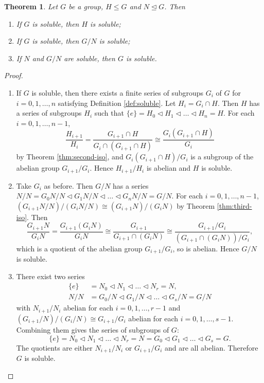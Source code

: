 \documentclass[12pt]{article}
\newtheorem{theorem}{Theorem}
\theoremstyle{definition}
\begin{document}
\begin{theorem} \label{thm:soluble-main}
    Let $G$ be a group, $H \le G$ and $N \trianglelefteq G$. Then 
    \begin{enumerate}
        \item If $G$ is soluble, then $H$ is soluble;
        \item If $G$ is soluble, then $G / N$ is soluble; 
        \item If $N$ and $G / N$ are soluble, then $G$ is soluble. 
    \end{enumerate}
\end{theorem}
\begin{proof}
\begin{enumerate}
    \item If $G$ is soluble, then there exists a finite series of subgroups $G_i$ of $G$ for $i = 0, 1, \dots, n$ satisfying Definition \ref{def:soluble}. Let $H_i = G_i \cap H$. Then $H$ has a series of subgroups $H_i$ such that $\{ e \} = H_0 \triangleleft H_1 \triangleleft \dots \triangleleft H_n = H.$
    For each $i = 0, 1, \dots, n - 1$, 
    $$
    \frac{H_{i+1}}{H_i} 
        = \frac{G_{i+1} \cap H}{G_i \cap (G_{i+1} \cap H)}
        \cong \frac{G_i(G_{i+1} \cap H)} {G_i}
    $$
    by Theorem \ref{thm:second-iso}, and ${G_i(G_{i+1} \cap H)}/{G_i}$ is a subgroup of the abelian group $G_{i+1} / G_{i}$. Hence $H_{i+1} / H_{i}$ is abelian and $H$ is soluble.
    \item Take $G_i$ as before. Then $G / N$ has a series
        $N/N = G_0 N / N \triangleleft G_1 N / N \triangleleft \dots \triangleleft G_n N / N  =  G / N. $
        For each $i = 0, 1, \dots, n - 1$, 
        $(G_{i+1} N / N) / (G_{i} N / N) \cong (G_{i+1} N) / (G_i N)$
    by Theorem \ref{thm:third-iso}. Then 
    $$
    \frac{G_{i+1} N}{G_i N} =\frac{G_{i+1}\left(G_i N\right)}{G_i N} \cong \frac{G_{i+1}}{G_{i+1} \cap\left(G_i N\right)} \cong \frac{G_{i+1} / G_i}{\left(G_{i+1} \cap\left(G_i N\right)\right) / G_i},
    $$
    which is a quotient of the abelian group $G_{i+1} / G_i$, so is abelian. Hence $G / N$ is soluble.
    \item There exist two series
$$
\begin{aligned}
\{ e \} & =N_0 \triangleleft N_1 \triangleleft \ldots \triangleleft N_r=N, \\
N / N & =G_0 / N \triangleleft G_1 / N \triangleleft \ldots \triangleleft G_s / N=G / N
\end{aligned}
$$
with $N_{i+1} / N_{i}$ abelian for each $i = 0, 1, \dots, r-1$ and $(G_{i+1} / N)  / (G_{i} / N) \cong G_{i+1} / G_i $ abelian for each $i = 0,1, \dots, s-1$. Combining them gives the series of subgroups of $G$:
$$
\{ e \}=N_0 \triangleleft N_1 \triangleleft \ldots \triangleleft N_r=N=G_0 \triangleleft G_1 \triangleleft \ldots \triangleleft G_s=G .
$$
The quotients are either $N_{i+1} / N_i$  or $G_{i+1} / G_i$ and are all abelian. Therefore $G$ is soluble.
\end{enumerate}
\end{proof}
\end{document}
